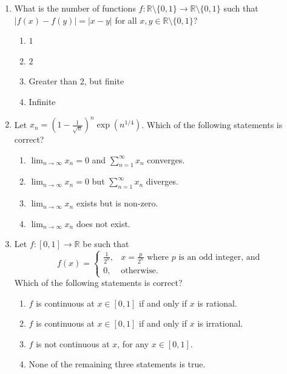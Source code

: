 \documentclass[11pt, a4paper]{article}
\begin{document}
\begin{enumerate}
  \item What is the number of functions $f: \mathbb{R} \setminus \{0, 1\} \to \mathbb{R} \setminus \{0, 1\}$ such that $|f(x) - f(y)| = |x - y|$ for all $x, y \in \mathbb{R} \setminus \{0, 1\}$?
  \begin{enumerate}[label=(\alph*)]
    \item $1$
    \item $2$
    \item Greater than $2$, but finite
    \item Infinite
  \end{enumerate}

  \item Let $x_n = \left(1 - \frac{1}{\sqrt{n}}\right)^n \exp(n^{1/4})$. Which of the following statements is correct?
  \begin{enumerate}[label=(\alph*)]
    \item $\lim_{n \to \infty} x_n = 0$ and $\sum_{n=1}^\infty x_n$ converges.
    \item $\lim_{n \to \infty} x_n = 0$ but $\sum_{n=1}^\infty x_n$ diverges.
    \item $\lim_{n \to \infty} x_n$ exists but is non-zero.
    \item $\lim_{n \to \infty} x_n$ does not exist.
  \end{enumerate}

  \item Let $f: [0,1] \to \mathbb{R}$ be such that
  \[
    f(x) = \begin{cases}
      \frac{1}{2^n}, & x = \frac{p}{2^n} \text{ where } p \text{ is an odd integer, and} \\
      0, & \text{otherwise.}
    \end{cases}
  \]
  Which of the following statements is correct?
  \begin{enumerate}[label=(\alph*)]
    \item $f$ is continuous at $x \in [0,1]$ if and only if $x$ is rational.
    \item $f$ is continuous at $x \in [0,1]$ if and only if $x$ is irrational.
    \item $f$ is not continuous at $x$, for any $x \in [0,1]$.
    \item None of the remaining three statements is true.
  \end{enumerate}


\end{enumerate}
\end{document}
